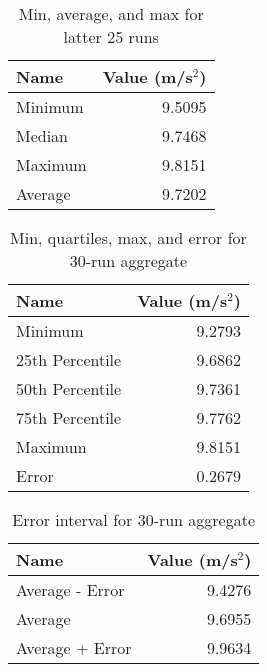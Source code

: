 \newpage
%
\begin{table}[ht]
    \centering
    \begin{tabular}{|l|r|}
        \hline
        Name & Value (m/s$^{2}$) \\
        \hline
        Minimum & 9.5095 \\
        Median & 9.7468 \\
        Maximum & 9.8151 \\
        Average & 9.7202 \\
        \hline
    \end{tabular}
    \caption{Min, average, and max for latter 25 runs}
    \label{table:01.describe.25}
\end{table}
%
\begin{table}[ht]
    \centering
    \begin{tabular}{|l|r|}
        \hline
        Name & Value (m/s$^{2}$) \\
        \hline
        Minimum & 9.2793 \\
        25th Percentile & 9.6862 \\
        50th Percentile & 9.7361 \\
        75th Percentile & 9.7762 \\
        Maximum & 9.8151 \\
        Error & 0.2679 \\
        \hline
    \end{tabular}
    \caption{Min, quartiles, max, and error for 30-run aggregate}
    \label{table:01.describe.30}
\end{table}
%
\begin{table}[ht]
    \centering
    \begin{tabular}{|l|r|}
        \hline
        Name & Value (m/s$^{2}$) \\
        \hline
        Average - Error & 9.4276 \\
        Average & 9.6955 \\
        Average + Error & 9.9634 \\
        \hline
    \end{tabular}
    \caption{Error interval for 30-run aggregate}
    \label{table:01.error.30}
\end{table}
\newpage
%
